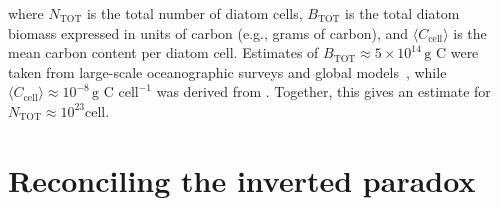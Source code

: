 \documentclass[%
 preprint,            %
 superscriptaddress, %
 amsmath,amssymb,    %
 aps,                %
 pra,                %
 floatfix,           %
]{revtex4-2}
\begin{document}
where $ N_{\mathrm{TOT}} $ is the total number of diatom cells, $ B_{\mathrm{TOT}} $ is the total diatom biomass expressed in units of carbon (e.g., grams of carbon), and $ \langle C_{\mathrm{cell}} \rangle $ is the mean carbon content per diatom cell. Estimates of $ B_{\mathrm{TOT}} \approx 5 \times 10^{14}\, \textrm{g C}$ were taken from large-scale oceanographic surveys and global models~\cite{leblanc2012global},
while $ \langle C_{\mathrm{cell}} \rangle  \approx 10^{-8} \, \textrm{g C cell}^{-1} $ was derived from \cite{linacre2021cell}. Together, this gives an estimate for $N_{\mathrm{TOT}} \approx 10^{23} \textrm{cell}$.

\section{Reconciling the inverted paradox}







\end{document}
